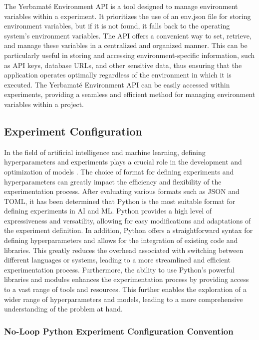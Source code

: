 \documentclass{IEEEtran}
\begin{document}
The Yerbamaté Environment API is a tool designed to manage environment variables within a experiment. It prioritizes the use of an env.json file for storing environment variables, but if it is not found, it falls back to the operating system's environment variables. The API offers a convenient way to set, retrieve, and manage these variables in a centralized and organized manner. This can be particularly useful in storing and accessing environment-specific information, such as API keys, database URLs, and other sensitive data, thus ensuring that the application operates optimally regardless of the environment in which it is executed. The Yerbamaté Environment API can be easily accessed within experiments, providing a seamless and efficient method for managing environment variables within a project. 





\subsection{Experiment Configuration}

In the field of artificial intelligence and machine learning, defining hyperparameters and experiments plays a crucial role in the development and optimization of models \cite{wu2019hyperparameter}. The choice of format for defining experiments and hyperparameters can greatly impact the efficiency and flexibility of the experimentation process. After evaluating various formats such as JSON and TOML, it has been determined that Python is the most suitable format for defining experiments in AI and ML. Python provides a high level of expressiveness and versatility, allowing for easy modifications and adaptations of the experiment definition. In addition, Python offers a straightforward syntax for defining hyperparameters and allows for the integration of existing code and libraries. This greatly reduces the overhead associated with switching between different languages or systems, leading to a more streamlined and efficient experimentation process. Furthermore, the ability to use Python's powerful libraries and modules enhances the experimentation process by providing access to a vast range of tools and resources. This further enables the exploration of a wider range of hyperparameters and models, leading to a more comprehensive understanding of the problem at hand.

\subsubsection{No-Loop Python Experiment Configuration Convention}
\end{document}
